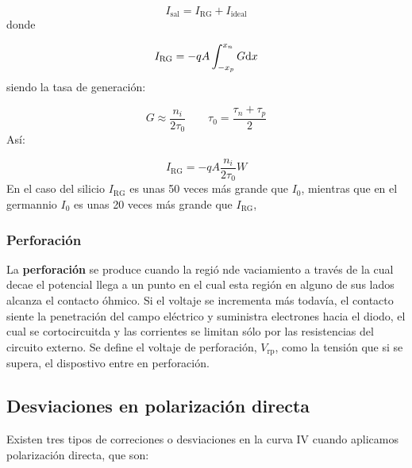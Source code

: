 \begin{equation}
    I_{\text{sal}} = I_{\text{RG}} + I_{\text{ideal}}
\end{equation}
donde 

\begin{equation}
    I_{\text{RG}} = - q A \int_{-x_p}^{x_n} G \mathrm{d} x
\end{equation}
siendo la tasa de generación: 

\begin{equation}
    G \approx \frac{n_i}{2\tau_0} \qquad \tau_0 = \frac{\tau_n+\tau_p}{2}
\end{equation}
Así: 

\begin{equation}
    I_{\text{RG}} = -q A \frac{n_i}{2\tau_0} W
\end{equation}
En el caso del silicio $I_{\text{RG}}$ es unas 50 veces más grande que $I_0$, mientras que en el germannio $I_0$ es unas 20 veces más grande que $I_{\text{RG}}$,

\subsubsection{Perforación}

La \textbf{perforación} se produce cuando la regió nde vaciamiento a través de la cual decae el potencial llega a un punto en el cual esta región en alguno de sus lados alcanza el contacto óhmico. Si el voltaje se incrementa más todavía, el contacto siente la penetración del campo eléctrico y suministra electrones hacia el diodo, el cual se cortocircuitda y las corrientes se limitan sólo por las resistencias del circuito externo. Se define el voltaje de perforación, $V_{\text{rp}}$, como la tensión que si se supera, el dispostivo entre en perforación. 

\subsection{Desviaciones en polarización directa}

Existen tres tipos de correciones o desviaciones en la curva IV cuando aplicamos polarización directa, que son:

